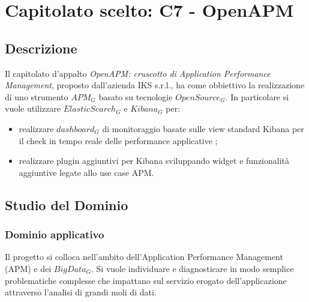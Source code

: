 \newpage
\section{Capitolato scelto: C7 - OpenAPM}
	\subsection{Descrizione}
	Il capitolato d'appalto \emph{OpenAPM: cruscotto di Application Performance Management},  proposto dall'azienda IKS s.r.l., ha come obbiettivo la realizzazione di uno strumento $APM_G$ basato su tecnologie $Open Source_G$. In particolare si vuole utilizzare $Elastic Search_G$ e $Kibana_G$ per:
	\begin{itemize}
		\item realizzare $dashboard_G$ di monitoraggio  basate sulle view standard Kibana per il check in tempo reale delle performance applicative ;
		\item realizzare plugin aggiuntivi per Kibana sviluppando widget e funzionalità aggiuntive legate allo use case APM. 
	\end{itemize}
	
	\subsection{Studio del Dominio}
		\subsubsection{Dominio applicativo}
		Il progetto si colloca nell'ambito dell'Application Performance Management (APM) e dei $Big Data_G$. Si vuole individuare e diagnosticare in modo semplice problematiche complesse che impattano sul servizio erogato dell'applicazione attraverso l'analisi di grandi moli di dati.
